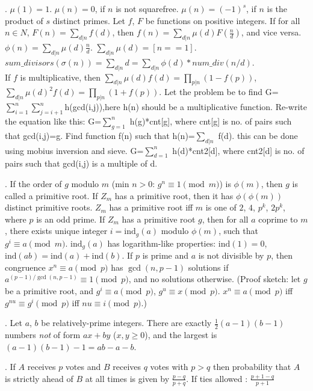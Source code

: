 .
$\mu(1) = 1$. $\mu(n) = 0$, if $n$ is not squarefree.
$\mu(n) = (-1)^s$, if $n$ is the product of $s$ distinct primes.
Let $f$, $F$ be functions on positive integers.
If for all $n \in N$, $F(n)=\sum_{d|n} f(d)$, then $f(n) = \sum_{d|n} \mu(d) F(\frac{n}{d})$,
and vice versa. \quad
$\phi(n) = \sum_{d|n} \mu(d) \frac{n}{d}$.
\quad $\sum_{d|n} \mu(d) = [n==1]. 
$$sum\_divisors(\sigma(n)) = \sum_{d|n} d = \sum_{d|n} \phi(d) * num\_div(n/d)$. \\
If $f$ is multiplicative, then $\sum_{d|n} \mu(d) f(d) = \prod_{p|n}(1-f(p))$,
$\sum_{d|n} \mu(d)^2 f(d) = \prod_{p|n} (1+f(p))$.
Let the problem be to find G=$\sum_{i=1}^n \sum_{j=i+1}^n $h(gcd(i,j)),here h(n) should be a multiplicative function.
Re-write the equation like this:  G=$\sum_{g=1}^n$ h(g)*cnt[g], where cnt[g] is no. of pairs such that gcd(i,j)=g.
Find function f(n) such that h(n)=$\sum_{d|n}$ f(d). this can be done using mobius inversion and sieve.
G=$\sum_{d=1}^n$ h(d)*cnt2[d], where cnt2[d] is no. of pairs such that gcd(i,j) is a multiple of d.
 
.  If the order of $g$ modulo $m$ (min $n>0$:
$g^n \equiv 1 \pmod{m}$) is $\phi(m)$, then $g$ is called a primitive root.
If $Z_m$ has a primitive root, then it has $\phi(\phi(m))$ distinct primitive
roots. $Z_m$ has a primitive root iff $m$ is one of $2$, $4$,
$p^k$, $2p^k$, where $p$ is an odd prime.
If $Z_m$ has a primitive root $g$, then for all $a$ coprime to $m$,
there exists unique integer $i=\text{ind}_g(a)$ modulo $\phi(m)$,
such that $g^i \equiv a \pmod{m}$.
$\text{ind}_g(a)$ has logarithm-like properties:
$\text{ind}(1) = 0$, $\text{ind}(ab) = \text{ind}(a) + \text{ind}(b)$.
If $p$ is prime and $a$ is not divisible by $p$, then congruence
$x^n \equiv a \pmod{p}$ has $\gcd(n, p-1)$ solutions if
$a^{(p-1)/\gcd(n,p-1)} \equiv 1 \pmod{p}$, and no solutions otherwise.
(Proof sketch: let $g$ be a primitive root, and
$g^i \equiv a \pmod{p}$, $g^u \equiv x \pmod{p}$.
$x^n \equiv a \pmod{p}$ iff $g^{nu} \equiv g^i \pmod{p}$ iff $nu \equiv i \pmod{p}$.)
 
.  Let $a$, $b$ be relatively-prime integers.
There are exactly $\frac{1}{2}(a-1)(b-1)$ numbers \emph{not} of form $ax+by$ ($x,y \ge 0$),
and the largest is $(a-1)(b-1)-1 = ab - a - b$.
 
. If $A$ receives $p$ votes and $B$ receives $q$ votes with $p > q$ then probability that $A$ is strictly ahead of $B$ at all times is given by $\frac{p-q}{p+q}$. If ties allowed : $\frac{p+1-q}{p+1}$
 
